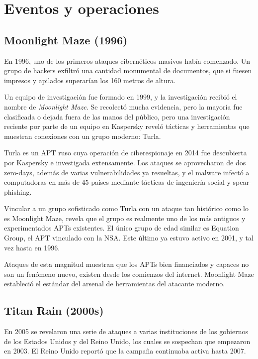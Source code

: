 \documentclass{article}
\begin{document}
\section{Eventos y operaciones}

\subsection{Moonlight Maze (1996)}
En 1996, uno de los primeros ataques cibernéticos masivos había comenzado. Un grupo de hackers exfiltró una cantidad monumental de documentos, que si fuesen impresos y apilados superarían los 160 metros de altura. \autocite{securelist-moonlight-maze}

Un equipo de investigación fue formado en 1999, y la investigación recibió el nombre de {\it Moonlight Maze}. Se recolectó mucha evidencia, pero la mayoría fue clasificada o dejada fuera de las manos del público, pero una investigación reciente por parte de un equipo en Kaspersky reveló tácticas y herramientas que muestran conexiones con un grupo moderno: Turla.

Turla es un APT ruso cuya operación de ciberespionaje en 2014 fue descubierta por Kaspersky e investigada extensamente. Los ataques se aprovecharon de dos zero-days, además de varias vulnerabilidades ya resueltas, y el malware infectó a computadoras en más de 45 países mediante tácticas de ingeniería social y spear-phishing. \autocite{securelist-turla}

Vincular a un grupo sofisticado como Turla con un ataque tan histórico como lo es Moonlight Maze, revela que el grupo es realmente uno de los más antiguos y experimentados APTs existentes. El único grupo de edad similar es Equation Group, el APT vinculado con la NSA. Este último ya estuvo activo en 2001, y tal vez hasta en 1996. \autocite{securelist-equation}

Ataques de esta magnitud muestran que los APTs bien financiados y capaces no son un fenómeno nuevo, existen desde los comienzos del internet. Moonlight Maze estableció el estándar del arsenal de herramientas del atacante moderno. 

\subsection{Titan Rain (2000s)}
En 2005 se revelaron una serie de ataques a varias instituciones de los gobiernos de los Estados Unidos y del Reino Unido, los cuales se sospechan que empezaron en 2003. El Reino Unido reportó que la campaña continuaba activa hasta 2007. \autocite{cfr-titan-rain}
\end{document}

